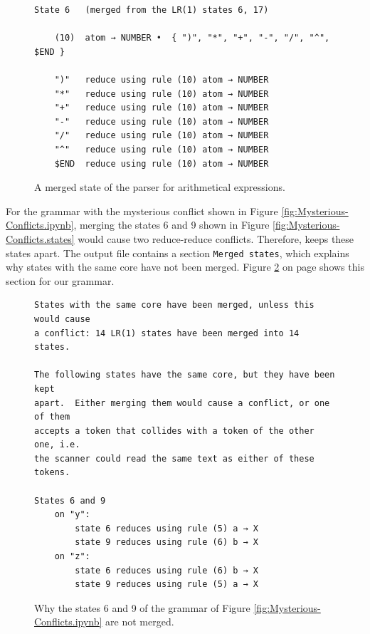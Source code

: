 \begin{figure}[!ht]
\centering
\begin{verbatim}
State 6   (merged from the LR(1) states 6, 17)

    (10)  atom → NUMBER •  { ")", "*", "+", "-", "/", "^", $END }

    ")"   reduce using rule (10) atom → NUMBER
    "*"   reduce using rule (10) atom → NUMBER
    "+"   reduce using rule (10) atom → NUMBER
    "-"   reduce using rule (10) atom → NUMBER
    "/"   reduce using rule (10) atom → NUMBER
    "^"   reduce using rule (10) atom → NUMBER
    $END  reduce using rule (10) atom → NUMBER
\end{verbatim}
\vspace*{-0.3cm}
\caption{A merged state of the parser for arithmetical expressions.}
\label{fig:Merging-States.state6}
\end{figure}

For the grammar with the mysterious conflict shown in Figure \ref{fig:Mysterious-Conflicts.ipynb}, merging the
states 6 and 9 shown in Figure \ref{fig:Mysterious-Conflicts.states} would cause two reduce-reduce conflicts.
Therefore,  keeps these states apart.  The output file contains a section
\texttt{Merged states}, which explains why states with the same core have not been merged.
Figure \ref{fig:Merging-States.mysterious} on page \pageref{fig:Merging-States.mysterious} shows this section for
our grammar.

\begin{figure}[!ht]
\centering
\begin{verbatim}
States with the same core have been merged, unless this would cause
a conflict: 14 LR(1) states have been merged into 14 states.

The following states have the same core, but they have been kept
apart.  Either merging them would cause a conflict, or one of them
accepts a token that collides with a token of the other one, i.e.
the scanner could read the same text as either of these tokens.

States 6 and 9
    on "y":
        state 6 reduces using rule (5) a → X
        state 9 reduces using rule (6) b → X
    on "z":
        state 6 reduces using rule (6) b → X
        state 9 reduces using rule (5) a → X
\end{verbatim}
\vspace*{-0.3cm}
\caption{Why the states 6 and 9 of the grammar of Figure \ref{fig:Mysterious-Conflicts.ipynb} are not merged.}
\label{fig:Merging-States.mysterious}
\end{figure}

